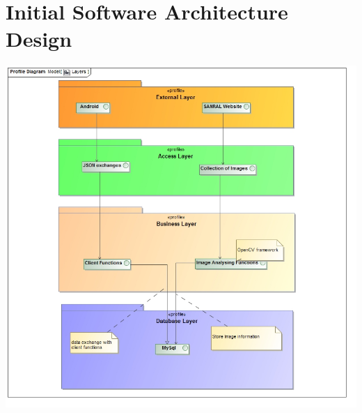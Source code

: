 \documentclass[a4paper,12pt]{article}
\begin{document}
\section{Initial Software Architecture Design}
\includegraphics[width=\textwidth]{Layers.jpg}
\end{document}
